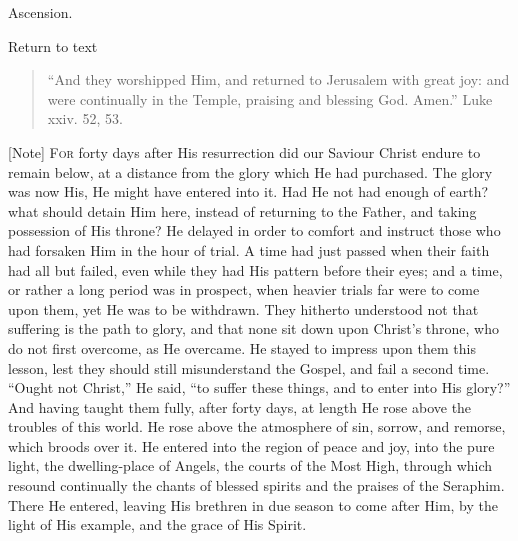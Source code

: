 
Ascension.

Return to text


\begin{quote}

``And they worshipped Him, and returned to Jerusalem with
great joy: and were continually in the Temple, praising and blessing
God. Amen.'' Luke xxiv. 52, 53.

\end{quote}

[Note] F\textsc{or} forty days after His
resurrection did our Saviour Christ endure to remain below, at a
distance from the glory which He had purchased. The glory was now His,
He might have entered into it. Had He not had enough of earth? what
should detain Him here, instead of returning to the Father, and taking
possession of His throne? He delayed in order to comfort and instruct
those who had forsaken Him in the hour of trial. A time had just
passed when their faith had all but failed, even while they had His
pattern before their eyes; and a time, or rather a long period was in
prospect, when heavier trials far were to come upon them, yet He was
to be withdrawn. They hitherto understood not that suffering is the
path to glory, and that none sit down upon Christ's throne, who do not
first overcome, as He overcame. He stayed to impress upon them this
lesson, lest they should still misunderstand the Gospel, and fail a
second time. ``Ought not Christ,'' He said, ``to suffer
these things, and to enter into His glory?'' And having taught
them fully, after forty days, at length He rose above the troubles of
this world. He rose above the atmosphere of sin, sorrow, and remorse,
which broods over it. He entered into the region of peace and joy,
into the pure light, the dwelling-place of Angels, the courts of the
Most High, through which resound continually the chants of blessed
spirits and the praises of the Seraphim. There He entered, leaving His
brethren in due season to come after Him, by the light of His example,
and the grace of His Spirit.

